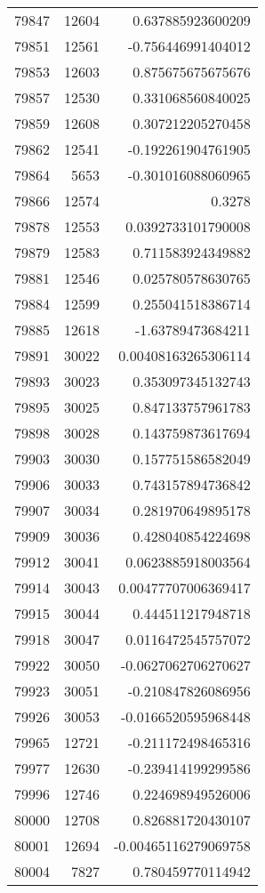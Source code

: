 \begin{tabular}{r | r | r}
79847 & 12604 & 0.637885923600209 \\
79851 & 12561 & -0.756446991404012 \\
79853 & 12603 & 0.875675675675676 \\
79857 & 12530 & 0.331068560840025 \\
79859 & 12608 & 0.307212205270458 \\
79862 & 12541 & -0.192261904761905 \\
79864 & 5653 & -0.301016088060965 \\
79866 & 12574 & 0.3278 \\
79878 & 12553 & 0.0392733101790008 \\
79879 & 12583 & 0.711583924349882 \\
79881 & 12546 & 0.025780578630765 \\
79884 & 12599 & 0.255041518386714 \\
79885 & 12618 & -1.63789473684211 \\
79891 & 30022 & 0.00408163265306114 \\
79893 & 30023 & 0.353097345132743 \\
79895 & 30025 & 0.847133757961783 \\
79898 & 30028 & 0.143759873617694 \\
79903 & 30030 & 0.157751586582049 \\
79906 & 30033 & 0.743157894736842 \\
79907 & 30034 & 0.281970649895178 \\
79909 & 30036 & 0.428040854224698 \\
79912 & 30041 & 0.0623885918003564 \\
79914 & 30043 & 0.00477707006369417 \\
79915 & 30044 & 0.444511217948718 \\
79918 & 30047 & 0.0116472545757072 \\
79922 & 30050 & -0.0627062706270627 \\
79923 & 30051 & -0.210847826086956 \\
79926 & 30053 & -0.0166520595968448 \\
79965 & 12721 & -0.211172498465316 \\
79977 & 12630 & -0.239414199299586 \\
79996 & 12746 & 0.224698949526006 \\
80000 & 12708 & 0.826881720430107 \\
80001 & 12694 & -0.00465116279069758 \\
80004 & 7827 & 0.780459770114942 \\

\end{tabular}

